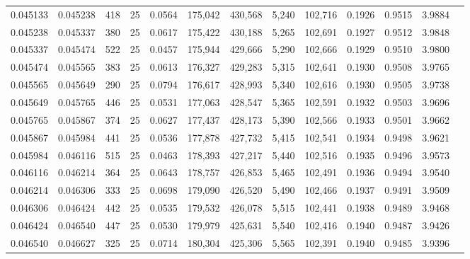 \begin{tabular}{rrrrrrrrrrrrr}
0.045133 & 0.045238 &   418 &  25 &                                     0.0564 & 175,042 & 430,568 &   5,240 & 102,716 & 0.1926 & 0.9515 & 3.9884 \\
0.045238 & 0.045337 &   380 &  25 &                                     0.0617 & 175,422 & 430,188 &   5,265 & 102,691 & 0.1927 & 0.9512 & 3.9848 \\
0.045337 & 0.045474 &   522 &  25 &                                     0.0457 & 175,944 & 429,666 &   5,290 & 102,666 & 0.1929 & 0.9510 & 3.9800 \\
0.045474 & 0.045565 &   383 &  25 &                                     0.0613 & 176,327 & 429,283 &   5,315 & 102,641 & 0.1930 & 0.9508 & 3.9765 \\
0.045565 & 0.045649 &   290 &  25 &                                     0.0794 & 176,617 & 428,993 &   5,340 & 102,616 & 0.1930 & 0.9505 & 3.9738 \\
0.045649 & 0.045765 &   446 &  25 &                                     0.0531 & 177,063 & 428,547 &   5,365 & 102,591 & 0.1932 & 0.9503 & 3.9696 \\
0.045765 & 0.045867 &   374 &  25 &                                     0.0627 & 177,437 & 428,173 &   5,390 & 102,566 & 0.1933 & 0.9501 & 3.9662 \\
0.045867 & 0.045984 &   441 &  25 &                                     0.0536 & 177,878 & 427,732 &   5,415 & 102,541 & 0.1934 & 0.9498 & 3.9621 \\
0.045984 & 0.046116 &   515 &  25 &                                     0.0463 & 178,393 & 427,217 &   5,440 & 102,516 & 0.1935 & 0.9496 & 3.9573 \\
0.046116 & 0.046214 &   364 &  25 &                                     0.0643 & 178,757 & 426,853 &   5,465 & 102,491 & 0.1936 & 0.9494 & 3.9540 \\
0.046214 & 0.046306 &   333 &  25 &                                     0.0698 & 179,090 & 426,520 &   5,490 & 102,466 & 0.1937 & 0.9491 & 3.9509 \\
0.046306 & 0.046424 &   442 &  25 &                                     0.0535 & 179,532 & 426,078 &   5,515 & 102,441 & 0.1938 & 0.9489 & 3.9468 \\
0.046424 & 0.046540 &   447 &  25 &                                     0.0530 & 179,979 & 425,631 &   5,540 & 102,416 & 0.1940 & 0.9487 & 3.9426 \\
0.046540 & 0.046627 &   325 &  25 &                                     0.0714 & 180,304 & 425,306 &   5,565 & 102,391 & 0.1940 & 0.9485 & 3.9396 \\

\end{tabular}
